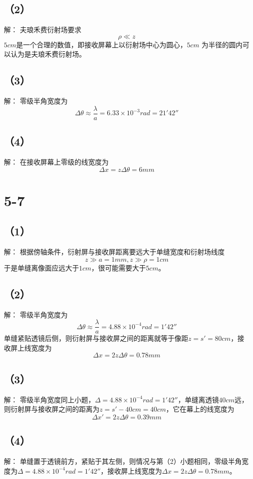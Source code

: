 \documentclass[10pt,a4paper]{article}
\begin{document}
\subsection*{（2）}解：
夫琅禾费衍射场要求
\[
\rho\ll z
\]
$5cm$是一个合理的数值，即接收屏幕上以衍射场中心为圆心，$5cm$ 为半径的圆内可以认为是夫琅禾费衍射场。
\subsection*{（3）}解：
零级半角宽度为
\[
\Delta\theta\approx\frac{\lambda}{a}=6.33\times10^{-3}rad=21'42''
\]
\subsection*{（4）}解：
在接收屏幕上零级的线宽度为
\[
\Delta x=z\Delta\theta=6mm
\]
\section*{5-7}
\subsection*{（1）}解：
根据傍轴条件，衍射屏与接收屏距离要远大于单缝宽度和衍射场线度
\[
z\gg a=1mm, z\gg\rho=1cm
\]
于是单缝离像面应远大于$1cm$，很可能需要大于$5cm$。
\subsection*{（2）}解：
零级半角宽度为
\[
\Delta\theta\approx\frac{\lambda}{a}=4.88\times10^{-4}rad=1'42''
\]
单缝紧贴透镜后侧，则衍射屏与接收屏之间的距离就等于像距$z=s'=80cm$，接收屏上线宽度为
\[
\Delta x=2z\Delta\theta=0.78mm
\]
\subsection*{（3）}解：
零级半角宽度同上小题，$\Delta=4.88\times10^{-4}rad=1'42''$，单缝离透镜$40cm$远，则衍射屏与接收屏之间的距离为$z=s'-40cm=40cm$，它在幕上的线宽度为
\[
\Delta x'=2z\Delta\theta=0.39mm
\]
\subsection*{（4）}解：
单缝置于透镜前方，紧贴于其左侧，则情况与第（2）小题相同，零级半角宽度为$\Delta=4.88\times10^{-4}rad=1'42''$，接收屏上线宽度为$\Delta x=2z\Delta\theta=0.78mm$。
\end{document}
